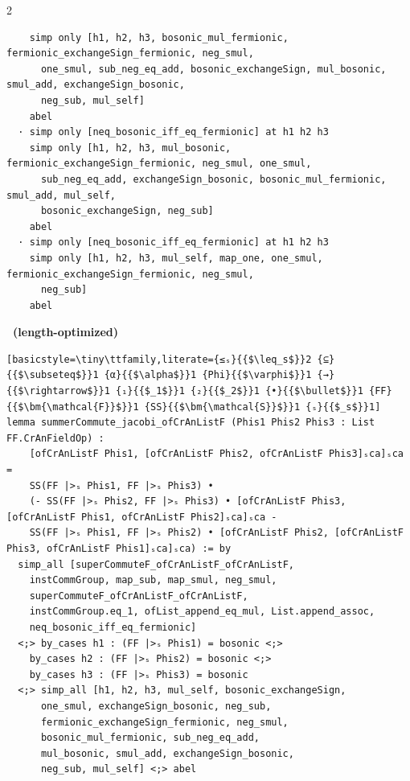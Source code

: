 {\begin{paracol}{2}
{\begin{lstlisting}
    simp only [h1, h2, h3, bosonic_mul_fermionic, fermionic_exchangeSign_fermionic, neg_smul,
      one_smul, sub_neg_eq_add, bosonic_exchangeSign, mul_bosonic, smul_add, exchangeSign_bosonic,
      neg_sub, mul_self]
    abel
  · simp only [neq_bosonic_iff_eq_fermionic] at h1 h2 h3
    simp only [h1, h2, h3, mul_bosonic, fermionic_exchangeSign_fermionic, neg_smul, one_smul,
      sub_neg_eq_add, exchangeSign_bosonic, bosonic_mul_fermionic, smul_add, mul_self,
      bosonic_exchangeSign, neg_sub]
    abel
  · simp only [neq_bosonic_iff_eq_fermionic] at h1 h2 h3
    simp only [h1, h2, h3, mul_self, map_one, one_smul, fermionic_exchangeSign_fermionic, neg_smul,
      neg_sub]
    abel
\end{lstlisting}
\switchcolumn
\textbf{\ImProver \ (length-optimized)}
\begin{lstlisting}[basicstyle=\tiny\ttfamily,literate={≤ₛ}{{$\leq_s$}}2 {⊆}{{$\subseteq$}}1 {α}{{$\alpha$}}1 {Phi}{{$\varphi$}}1 {→}{{$\rightarrow$}}1 {₁}{{$_1$}}1 {₂}{{$_2$}}1 {•}{{$\bullet$}}1 {FF}{{$\bm{\mathcal{F}}$}}1 {SS}{{$\bm{\mathcal{S}}$}}1 {ₛ}{{$_s$}}1]
lemma summerCommute_jacobi_ofCrAnListF (Phis1 Phis2 Phis3 : List FF.CrAnFieldOp) :
    [ofCrAnListF Phis1, [ofCrAnListF Phis2, ofCrAnListF Phis3]ₛca]ₛca =
    SS(FF |>ₛ Phis1, FF |>ₛ Phis3) •
    (- SS(FF |>ₛ Phis2, FF |>ₛ Phis3) • [ofCrAnListF Phis3, [ofCrAnListF Phis1, ofCrAnListF Phis2]ₛca]ₛca -
    SS(FF |>ₛ Phis1, FF |>ₛ Phis2) • [ofCrAnListF Phis2, [ofCrAnListF Phis3, ofCrAnListF Phis1]ₛca]ₛca) := by
  simp_all [superCommuteF_ofCrAnListF_ofCrAnListF,
    instCommGroup, map_sub, map_smul, neg_smul,
    superCommuteF_ofCrAnListF_ofCrAnListF,
    instCommGroup.eq_1, ofList_append_eq_mul, List.append_assoc,
    neq_bosonic_iff_eq_fermionic]
  <;> by_cases h1 : (FF |>ₛ Phis1) = bosonic <;>
    by_cases h2 : (FF |>ₛ Phis2) = bosonic <;>
    by_cases h3 : (FF |>ₛ Phis3) = bosonic
  <;> simp_all [h1, h2, h3, mul_self, bosonic_exchangeSign,
      one_smul, exchangeSign_bosonic, neg_sub,
      fermionic_exchangeSign_fermionic, neg_smul,
      bosonic_mul_fermionic, sub_neg_eq_add,
      mul_bosonic, smul_add, exchangeSign_bosonic,
      neg_sub, mul_self] <;> abel
\end{lstlisting}
}
\end{paracol}

\label{fig:improver2-length-super-commute}
}



